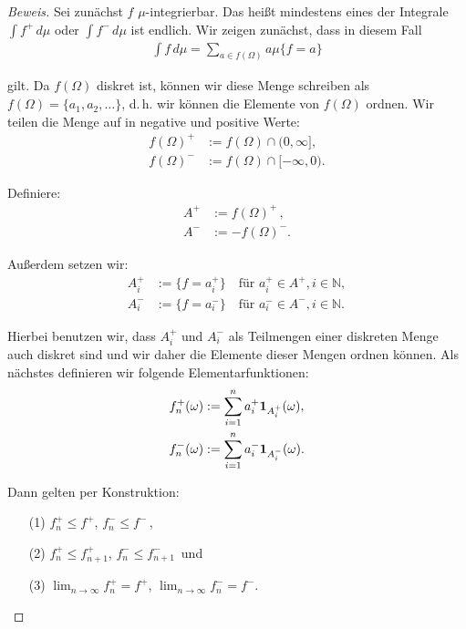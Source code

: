 \documentclass[10pt]{article}
\newcommand{\N}{\mathbb{N}}
\begin{document}
\begin{proof}[Beweis]
  Sei zunächst $f$ $\mu$-integrierbar. Das heißt mindestens eines der Integrale 
  $\int f^{+} \,d\mu$ oder $\int f^{-} \,d\mu$ ist endlich.
  Wir zeigen zunächst, dass in diesem Fall
  \begin{align*}
    \int f \,d\mu = \sum_{a\in f(\Omega)} a\mu\{f=a\}
  \end{align*}

  gilt. Da $f(\Omega)$ diskret ist, können wir diese Menge schreiben als 
  $f(\Omega) = \{ a_1,a_2,\dots \}$, d.\,h. wir können die Elemente von $f(\Omega)$  
  ordnen. Wir teilen die Menge auf in negative und positive Werte:
  \begin{align*}
    f(\Omega)^{+} &:= f(\Omega)\cap(0,\infty], \\
    f(\Omega)^{-} &:= f(\Omega)\cap[-\infty,0).
  \end{align*}
  
  Definiere:
  \begin{align*}
    A^{+} &:= f(\Omega)^{+} \,,  \\
    A^{-} &:= -f(\Omega)^{-}.
  \end{align*}

  Außerdem setzen wir:
  \begin{align*}
    A_i^{+} &:= \{ f = a_i^+ \} \quad\text{für $a_i^+\in A^+, i\in\N$}, \\
    A_i^{-} &:= \{ f = a_i^- \} \quad\text{für $a_i^-\in A^-, i\in\N$}.
  \end{align*}

  Hierbei benutzen wir, dass $A_i^{+}$ und $A_i^{-}$ als Teilmengen einer diskreten Menge 
  auch diskret sind und wir daher die Elemente dieser Mengen ordnen können.  
  Als nächstes definieren wir folgende Elementarfunktionen:
  \begin{align*}
      f^{+}_n(\omega) &:= \sum_{i=1}^{n} a_i^+ \text{\textbf{1}}_{A^{+}_i}(\omega), \\                                                               
      f^{-}_n(\omega) &:= \sum_{i=1}^{n} a_i^- \text{\textbf{1}}_{A^{-}_i}(\omega).                                   
  \end{align*}

  Dann gelten per Konstruktion:
  \begin{itemize}
    \item[(1)] $f_n^+ \leq f^{+}$, $f_n^- \leq f^{-}$\,,
    \item[(2)] $f_n^+ \leq f_{n+1}^+$, $f_n^- \leq f_{n+1}^-$\, und
    \item[(3)] $\lim_{n\to\infty} f_n^{+} = f^{+}$, $\lim_{n\to\infty} f_n^{-} = f^{-}$.
  \end{itemize}


\end{proof}
\end{document}

